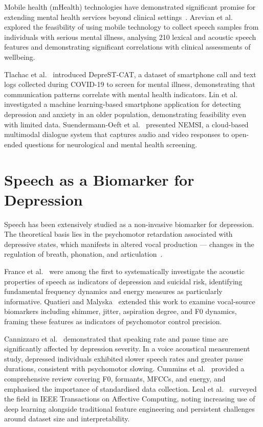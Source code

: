 Mobile health (mHealth) technologies have demonstrated significant promise for extending mental health services beyond clinical settings~\cite{Kumar2013}. Arevian et al.~\cite{Arevian2020} explored the feasibility of using mobile technology to collect speech samples from individuals with serious mental illness, analysing 210 lexical and acoustic speech features and demonstrating significant correlations with clinical assessments of wellbeing.

Tlachac et al.~\cite{Tlachac2022} introduced DepreST-CAT, a dataset of smartphone call and text logs collected during COVID-19 to screen for mental illness, demonstrating that communication patterns correlate with mental health indicators. Lin et al.~\cite{Lin2022} investigated a machine learning-based smartphone application for detecting depression and anxiety in an older population, demonstrating feasibility even with limited data. Suendermann-Oeft et al.~\cite{Suendermann2019} presented NEMSI, a cloud-based multimodal dialogue system that captures audio and video responses to open-ended questions for neurological and mental health screening.

\section{Speech as a Biomarker for Depression}

Speech has been extensively studied as a non-invasive biomarker for depression. The theoretical basis lies in the psychomotor retardation associated with depressive states, which manifests in altered vocal production — changes in the regulation of breath, phonation, and articulation~\cite{Cummins2015}.

France et al.~\cite{France2000} were among the first to systematically investigate the acoustic properties of speech as indicators of depression and suicidal risk, identifying fundamental frequency dynamics and energy measures as particularly informative. Quatieri and Malyska~\cite{Quatieri2012} extended this work to examine vocal-source biomarkers including shimmer, jitter, aspiration degree, and F0 dynamics, framing these features as indicators of psychomotor control precision.

Cannizzaro et al.~\cite{Cannizzaro2004} demonstrated that speaking rate and pause time are significantly affected by depression severity. In a voice acoustical measurement study, depressed individuals exhibited slower speech rates and greater pause durations, consistent with psychomotor slowing. Cummins et al.~\cite{Cummins2015} provided a comprehensive review covering F0, formants, MFCCs, and energy, and emphasised the importance of standardised data collection. Leal et al.~\cite{Leal2024} surveyed the field in IEEE Transactions on Affective Computing, noting increasing use of deep learning alongside traditional feature engineering and persistent challenges around dataset size and interpretability.

